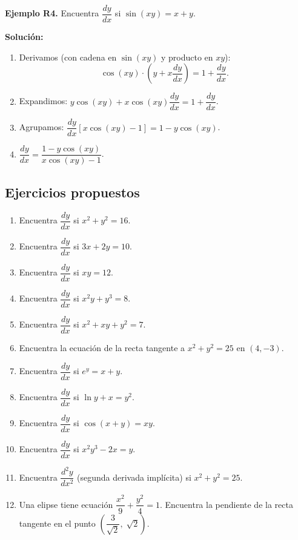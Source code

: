 \documentclass[12pt, letterpaper]{article}
\begin{document}
\textbf{Ejemplo R4.} Encuentra $\dfrac{dy}{dx}$ si $\sin(xy) = x + y$.

\begin{cuadrosolucion}
  \textbf{Solución:}
  \begin{enumerate}
    \item Derivamos (con cadena en $\sin(xy)$ y producto en $xy$):
          $$\cos(xy) \cdot \left(y + x\dfrac{dy}{dx}\right) = 1 + \dfrac{dy}{dx}.$$
    \item Expandimos: $y\cos(xy) + x\cos(xy)\dfrac{dy}{dx} = 1 + \dfrac{dy}{dx}$.
    \item Agrupamos: $\dfrac{dy}{dx}\left[x\cos(xy) - 1\right] = 1 - y\cos(xy)$.
    \item $\dfrac{dy}{dx} = \dfrac{1 - y\cos(xy)}{x\cos(xy) - 1}$.
  \end{enumerate}
\end{cuadrosolucion}

\newpage

\subsection{Ejercicios propuestos}

\begin{enumerate}[resume=ejercicios, leftmargin=*]
  \item \facil{} Encuentra $\dfrac{dy}{dx}$ si $x^2 + y^2 = 16$.
  \item \facil{} Encuentra $\dfrac{dy}{dx}$ si $3x + 2y = 10$.
  \item \facil{} Encuentra $\dfrac{dy}{dx}$ si $xy = 12$.
  \item \medio{} Encuentra $\dfrac{dy}{dx}$ si $x^2 y + y^3 = 8$.
  \item \medio{} Encuentra $\dfrac{dy}{dx}$ si $x^2 + xy + y^2 = 7$.
  \item \medio{} Encuentra la ecuación de la recta tangente a $x^2 + y^2 = 25$ en $(4, -3)$.
  \item \medio{} Encuentra $\dfrac{dy}{dx}$ si $e^y = x + y$.
  \item \medio{} Encuentra $\dfrac{dy}{dx}$ si $\ln y + x = y^2$.
  \item \dificil{} Encuentra $\dfrac{dy}{dx}$ si $\cos(x + y) = xy$.
  \item \dificil{} Encuentra $\dfrac{dy}{dx}$ si $x^2 y^3 - 2x = y$.
  \item \dificil{} Encuentra $\dfrac{d^2y}{dx^2}$ (segunda derivada implícita) si $x^2 + y^2 = 25$.
  \item \dificil{} Una elipse tiene ecuación $\dfrac{x^2}{9} + \dfrac{y^2}{4} = 1$. Encuentra la pendiente de la recta tangente en el punto $\left(\dfrac{3}{\sqrt{2}},\; \sqrt{2}\right)$.
\end{enumerate}
\end{document}

